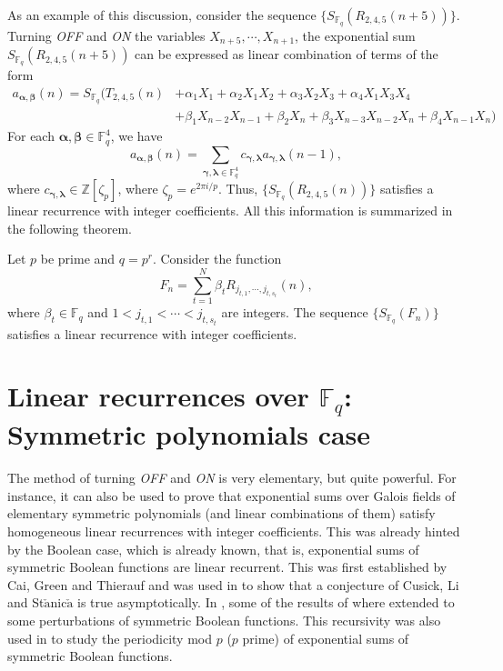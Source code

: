 As an example of this discussion, consider the sequence $\{S_{\mathbb{F}_q}(R_{2,4,5}(n+5))\}$.  Turning {\it OFF} and {\it ON} the variables $X_{n+5},\cdots,X_{n+1}$, the exponential 
sum $S_{\mathbb{F}_q}(R_{2,4,5}(n+5))$ can be expressed as linear combination of terms of the form
\begin{align*}
 a_{\boldsymbol{\alpha},\boldsymbol{\beta}}(n)=S_{\mathbb{F}_q}(T_{2,4,5}(n)&+\alpha _1 X_1+\alpha _2 X_1 X_2+\alpha _3 X_2 X_3+\alpha _4X_1 X_3 X_4\\
 &+\beta _1 X_{n-2} X_{n-1}+\beta _2 X_n+\beta _3 X_{n-3} X_{n-2} X_n+\beta _4X_{n-1} X_n)
\end{align*}
For each $\boldsymbol{\alpha},\boldsymbol{\beta} \in \mathbb{F}_q^{4}$, we have
$$a_{\boldsymbol{\alpha},\boldsymbol{\beta}}(n)=\sum_{\boldsymbol{\gamma},\boldsymbol{\lambda} \in\mathbb{F}_q^{4}} c_{\boldsymbol{\gamma},\boldsymbol{\lambda}}a_{\boldsymbol{\gamma},\boldsymbol{\lambda}}(n-1),$$
where $c_{\boldsymbol{\gamma},\boldsymbol{\lambda}} \in \mathbb{Z}[\zeta_p]$, where $\zeta_p = e^{2\pi i/p}$.  Thus, $\{S_{\mathbb{F}_q}(R_{2,4,5}(n))\}$ satisfies a linear recurrence with integer coefficients.
All this information is summarized in the following theorem.

\begin{theorem}
 Let $p$ be prime and $q=p^r$.  Consider the function 
 $$F_n = \sum_{t=1}^N \beta_t R_{j_{t,1},\cdots, j_{t,s_t}}(n),$$
 where $\beta_t\in \mathbb{F}_q$ and $1<j_{t,1}<\cdots<j_{t,s_t}$ are integers.  The sequence $\{S_{\mathbb{F}_q}(F_n)\}$ satisfies a linear recurrence with integer coefficients.
\end{theorem}


\section{Linear recurrences over $\mathbb{F}_q$: Symmetric polynomials case}
\label{symmetriccase}

The method of turning {\it OFF} and {\it ON} is very elementary, but quite powerful.  For instance, it can also be used to prove that exponential sums over Galois fields of elementary symmetric polynomials (and linear combinations of them) satisfy homogeneous linear
recurrences with integer coefficients.  This was already hinted by the Boolean case, which is already known, that is, exponential sums of symmetric Boolean functions are linear recurrent.  This was first 
established by Cai, Green and Thierauf \cite{cai} and was used in \cite{cm1} to show that a conjecture of Cusick, Li and St$\check{\mbox{a}}$nic$\check{\mbox{a}}$ \cite{cusick2} is true asymptotically.  In \cite{cm2}, some of the results of 
\cite{cm1} where extended to some perturbations of symmetric Boolean functions.  This recursivity was also used in \cite{cm3, cusick4} to study the periodicity mod $p$ ($p$ prime) of exponential sums of 
symmetric Boolean functions. 

